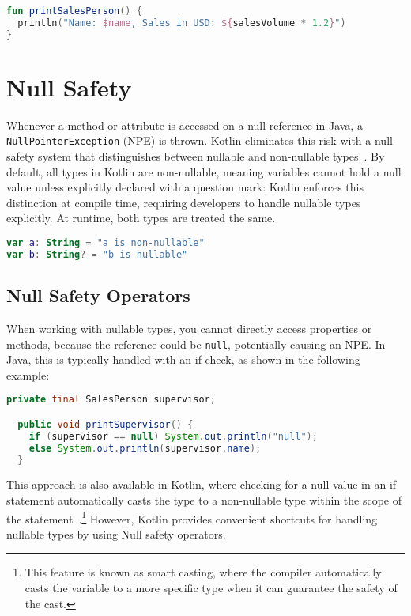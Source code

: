 \documentclass[a4paper,11pt]{article}
\begin{document}
\begin{lstlisting}[language=Kotlin, title={String Interpolation}]
fun printSalesPerson() {
  println("Name: $name, Sales in USD: ${salesVolume * 1.2}")
}
\end{lstlisting}

\section{Null Safety}
Whenever a method or attribute is accessed on a null reference in Java, a \texttt{NullPointerException} (NPE) is thrown. Kotlin eliminates this risk with a null safety system that distinguishes between nullable and non-nullable types~\cite{nullsafety,nullsafety-nullable-types}. By default, all types in Kotlin are non-nullable, meaning variables cannot hold a null value unless explicitly declared with a question mark:
Kotlin enforces this distinction at compile time, requiring developers to handle nullable types explicitly. At runtime, both types are treated the same.
\begin{lstlisting}[language=Kotlin]
var a: String = "a is non-nullable"
var b: String? = "b is nullable"
\end{lstlisting}

\subsection{Null Safety Operators}
When working with nullable types, you cannot directly access properties or methods, because the reference could be \texttt{null}, potentially causing an NPE.
In Java, this is typically handled with an if check, as shown in the following example:
\begin{lstlisting}[language=Java]
  private final SalesPerson supervisor;

  public void printSupervisor() {
    if (supervisor == null) System.out.println("null");
    else System.out.println(supervisor.name);
  }
\end{lstlisting}

This approach is also available in Kotlin, where checking for a null value in an if statement automatically casts the type to a non-nullable type within the scope of the statement~\cite{nullsafety-if-condition}.\footnote{This feature is known as smart casting, where the compiler automatically casts the variable to a more specific type when it can guarantee the safety of the cast.}
However, Kotlin provides convenient shortcuts for handling nullable types by using Null safety operators.
\end{document}
